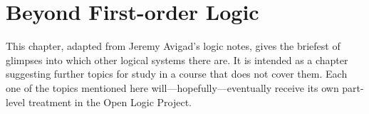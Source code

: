 \documentclass[../../../include/open-logic-chapter]{subfiles}
\begin{document}
\chapter{Beyond First-order Logic}

\begin{editorial}
  This chapter, adapted from Jeremy Avigad's logic notes, gives the
  briefest of glimpses into which other logical systems there are. It
  is intended as a chapter suggesting further topics for study in a
  course that does not cover them.  Each one of the topics mentioned
  here will---hopefully---eventually receive its own part-level
  treatment in the Open Logic Project.
\end{editorial}








\OLEndChapterHook
\end{document}
